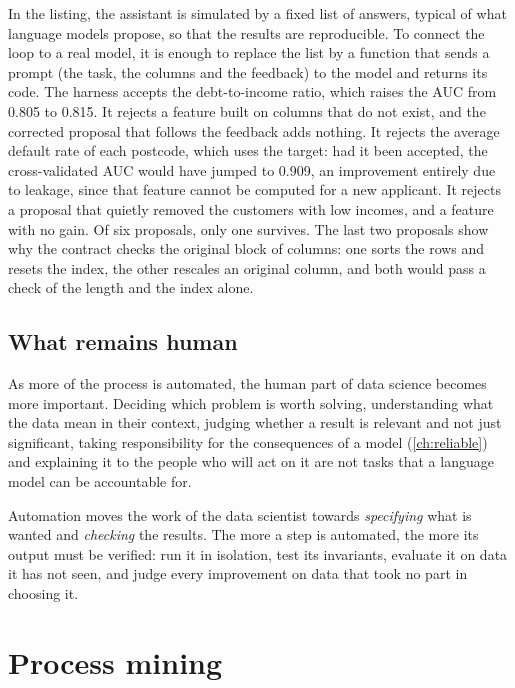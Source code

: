 In the listing, the assistant is simulated by a fixed list of answers, typical of what language models propose, so that the
results are reproducible. To connect the loop to a real model, it is enough to replace the list by a function that sends a prompt
(the task, the columns and the feedback) to the model and returns its code. The harness accepts the debt-to-income ratio, which
raises the AUC from 0.805 to 0.815. It rejects a feature built on columns that do not exist, and the corrected proposal that
follows the feedback adds nothing. It rejects the average default rate of each postcode, which uses the target: had it been
accepted, the cross-validated AUC would have jumped to 0.909, an improvement entirely due to leakage, since that feature
cannot be computed for a new applicant. It rejects a proposal that quietly removed the customers with low incomes, and a feature
with no gain. Of six proposals, only one survives. The last two proposals show why the contract checks the original block of columns: one sorts the rows and resets the
index, the other rescales an original column, and both would pass a check of the length and the index alone.

\subsection{What remains human}

As more of the process is automated, the human part of data science becomes more important. Deciding which problem
is worth solving, understanding what the data mean in their context, judging whether a result is relevant and not just
significant, taking responsibility for the consequences of a model (\cref{ch:reliable}) and explaining it to the people who
will act on it are not tasks that a language model can be accountable for.

\begin{keyidea}
Automation moves the work of the data scientist towards \emph{specifying} what is wanted and \emph{checking} the results. The more a step is
automated, the more its output must be verified: run it in isolation, test its invariants, evaluate it on data it has not seen,
and judge every improvement on data that took no part in choosing it.
\end{keyidea}

\section{Process mining}\label{sec:procmining}

